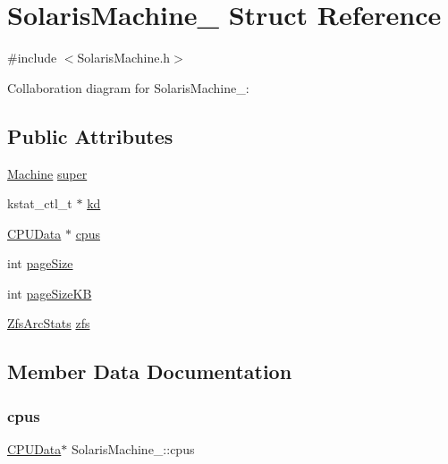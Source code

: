 \hypertarget{structSolarisMachine__}{}\section{Solaris\+Machine\+\_\+ Struct Reference}
\label{structSolarisMachine__}


{\ttfamily \#include $<$Solaris\+Machine.\+h$>$}



Collaboration diagram for Solaris\+Machine\+\_\+\+:
\subsection*{Public Attributes}
\begin{DoxyCompactItemize}
\item 
\hyperlink{Machine_8h_aa3706f95e4706b9d02979efcabb1341d}{Machine} \hyperlink{structSolarisMachine___af2b38f9298933b11d44f31674a985a9c}{super}
\item 
kstat\+\_\+ctl\+\_\+t $\ast$ \hyperlink{structSolarisMachine___a51eb11b263b5118220dc2143fc5c80b2}{kd}
\item 
\hyperlink{DragonFlyBSDMachine_8h_a144f55b34d84d75d470d730435fef363}{C\+P\+U\+Data} $\ast$ \hyperlink{structSolarisMachine___a1b0ad2c22825ed0d24bdf9b7d8dee7bc}{cpus}
\item 
int \hyperlink{structSolarisMachine___a8f9833ac0b327f81ec6223d1bd012433}{page\+Size}
\item 
int \hyperlink{structSolarisMachine___a05d5226553ae8a7c0bce414c7dfcdd37}{page\+Size\+KB}
\item 
\hyperlink{ZfsArcStats_8h_a2adeccbbba50329f61d34f355e5faddc}{Zfs\+Arc\+Stats} \hyperlink{structSolarisMachine___a2dbff60f2015a649c03eab1c769659b3}{zfs}
\end{DoxyCompactItemize}


\subsection{Member Data Documentation}
\mbox{\label{structSolarisMachine___a1b0ad2c22825ed0d24bdf9b7d8dee7bc}} 
\subsubsection{\texorpdfstring{cpus}{cpus}}
{\footnotesize\ttfamily \hyperlink{DragonFlyBSDMachine_8h_a144f55b34d84d75d470d730435fef363}{C\+P\+U\+Data}$\ast$ Solaris\+Machine\+\_\+\+::cpus}

